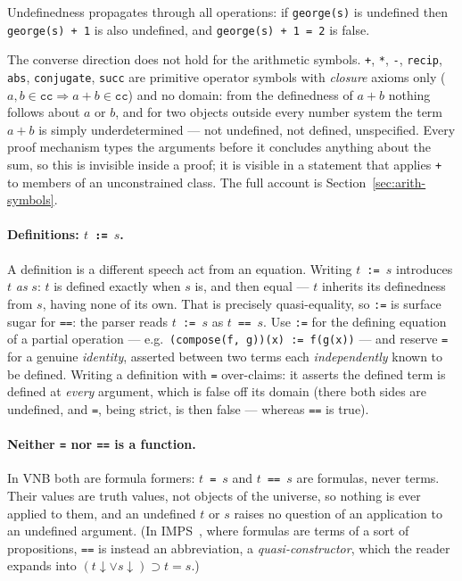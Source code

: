 \noindent
Undefinedness propagates through all operations: if \texttt{george(s)}
is undefined then \texttt{george(s) + 1} is also undefined,
and \texttt{george(s) + 1 = 2} is false.

The converse direction does not hold for the arithmetic symbols.
\texttt{+}, \texttt{*}, \texttt{-}, \texttt{recip}, \texttt{abs},
\texttt{conjugate}, \texttt{succ} are primitive operator symbols with
\emph{closure} axioms only ($a, b \in \mathtt{cc} \Rightarrow a + b \in
\mathtt{cc}$) and no domain: from the definedness of $a + b$ nothing follows
about $a$ or $b$, and for two objects outside every number system the term
$a + b$ is simply underdetermined --- not undefined, not defined, unspecified.
Every proof mechanism types the arguments before it concludes anything about
the sum, so this is invisible inside a proof; it is visible in a statement
that applies \texttt{+} to members of an unconstrained class.  The full
account is Section~\ref{sec:arith-symbols}.

\paragraph{Definitions: \texttt{$t$ := $s$}.}
A definition is a different speech act from an equation.  Writing
\texttt{$t$ := $s$} introduces $t$ \emph{as} $s$: $t$ is defined exactly when
$s$ is, and then equal --- $t$ inherits its definedness from $s$, having none
of its own.  That is precisely quasi-equality, so \texttt{:=} is surface
sugar for \texttt{==}: the parser reads \texttt{$t$ := $s$} as
\texttt{$t$ == $s$}.  Use \texttt{:=} for the defining equation of a partial
operation --- e.g.\ \texttt{(compose(f, g))(x) := f(g(x))} --- and reserve
\texttt{=} for a genuine \emph{identity}, asserted between two terms each
\emph{independently} known to be defined.  Writing a definition with
\texttt{=} over-claims: it asserts the defined term is defined at
\emph{every} argument, which is false off its domain (there both sides are
undefined, and \texttt{=}, being strict, is then false --- whereas
\texttt{==} is true).

\paragraph{Neither \texttt{=} nor \texttt{==} is a function.}
In VNB both are formula formers: $t$~\texttt{=}~$s$ and
$t$~\texttt{==}~$s$ are formulas, never terms.  Their values are truth
values, not objects of the universe, so nothing is ever applied to them,
and an undefined $t$ or $s$ raises no question of an application to an
undefined argument.  (In IMPS~\cite{IMPS}, where formulas are terms of a
sort of propositions, \texttt{==} is instead an abbreviation, a
\emph{quasi-constructor}, which the reader expands into
$(t{\downarrow} \lor s{\downarrow}) \supset t = s$.)

